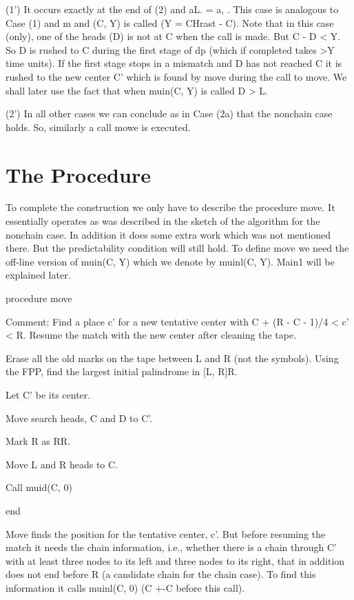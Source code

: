 \documentclass[11pt,a4paper]{report}
\begin{document}
(1’) It occurs exactly at the end of (2) and aL. = a, . This case is analogous to
Case (1) and m and (C, Y) is called (Y = CHrast - C). Note that in this case (only), one
of the heads (D) is not at C when the call is made. But C - D < Y. So D is rushed to C
during the first stage of dp (which if completed takes >Y time units). If the first stage
stops in a mismatch and D has not reached C it is rushed to the new center C’ which is
found by move during the call to move. We shall later use the fact that when muin(C, Y)
is called D > L.

(2’) In all other cases we can conclude as in Case (2a) that the nonchain case holds.
So, similarly a call mowe is executed. 





\chapter{The Procedure}

To complete the construction we only have to describe the procedure move. It essentially
operates as was described in the sketch of the algorithm for the nonchain case. In addition
it does some extra work which was not mentioned there. But the predictability condition
will still hold. To define move we need the off-line version of muin(C, Y) which we denote
by muinl(C, Y). Main1 will be explained later.


procedure move
\begin{myindentpar}{3cm}
Comment: Find a place c’ for a new tentative center with
C + (R - C - 1)/4 < c’ < R. Resume the match with the new center
after cleaning the tape.

Erase all the old marks on the tape between L and R (not the symbols).
Using the FPP, find the largest initial palindrome in [L, R]R.

Let C’ be its center.

Move search heads, C and D to C’.

Mark R as RR.

Move L and R heads to C.

Call muid(C, 0)
\end{myindentpar}

end

Move finds the position for the tentative center, c’. But before resuming the match
it needs the chain information, i.e., whether there is a chain through C’ with at least three
nodes to its left and three nodes to its right, that in addition does not end before R
(a candidate chain for the chain case). To find this information it calls muinl(C, 0) (C +-C
before this call).
\end{document}
